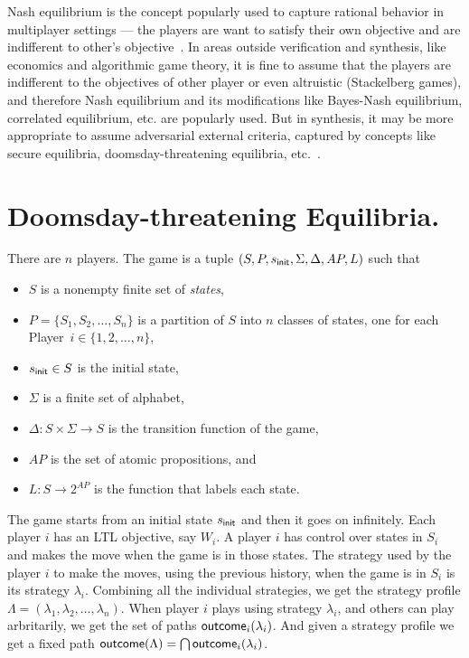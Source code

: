 \documentclass[format=acmsmall, review=false]{acmart}
\newcommand{\outcome}{\textnormal{\textsf{outcome}}}
\begin{document}
Nash equilibrium is the concept popularly used to capture rational behavior in multiplayer settings --- the players are want to satisfy their own objective and are indifferent to other's objective~\cite{Nash48}. In areas outside verification and synthesis, like economics and algorithmic game theory, it is fine to assume that the players are indifferent to the objectives of other player or even altruistic (Stackelberg games), and therefore Nash equilibrium and its modifications like Bayes-Nash equilibrium, correlated equilibrium, etc. are popularly used. But in synthesis, it may be more appropriate to assume adversarial external criteria, captured by concepts like secure equilibria, doomsday-threatening equilibria, etc.~\cite{ummels2011complexity,chatterjee2006secure}.

\section{Doomsday-threatening Equilibria.}
There are $n$ players. The game is a tuple $(S, P, s_{{\sf init}}, \Sigma, \Delta, AP, L)$ such that 
\begin{itemize}
    \item $S$ is a nonempty finite set of \textit{states},
    \item $P=\{S_1,S_2,\dots,S_n\}$ is a partition of $S$ into $n$ classes of states, one for each Player~$i \in \{ 1,2,\dots,n\}$, 
    \item $s_{{\sf init}} \in S$ is the initial state, 
    \item $\Sigma$ is a finite set of alphabet,  
    \item $\Delta : S \times \Sigma \rightarrow S$ is the transition function of the game,
    \item $AP$ is the set of atomic propositions, and
    \item $L : S \rightarrow 2^{AP}$ is the function that labels each state.
\end{itemize}

The game starts from an initial state $s_{{\sf init}}$ and then it goes on infinitely. Each player $i$ has an LTL objective, say $W_i$. A player $i$ has control over states in $S_i$ and makes the move when the game is in those states. The strategy used by the player $i$ to make the moves, using the previous history, when the game is in $S_i$ is its strategy $\lambda_i$. Combining all the individual strategies, we get the strategy profile $\Lambda=(\lambda_1,\lambda_2,\dots,\lambda_n)$. When player $i$ plays using strategy $\lambda_i$, and others can play arbritarily, we get the set of paths $\outcome_i(\lambda_i)$. And given a strategy profile we get a fixed path $\outcome(\Lambda) = \bigcap \outcome_i(\lambda_i) $.
\end{document}
